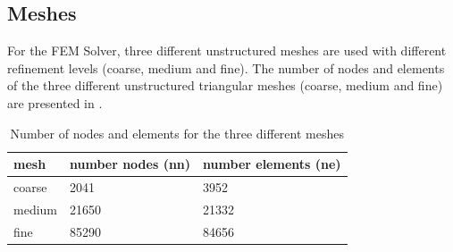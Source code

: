 \subsection{Meshes}
For the FEM Solver, three different unstructured meshes are used with different refinement levels (coarse, medium and fine). The number of nodes and elements of the three different unstructured triangular meshes (coarse, medium and fine) are presented in .
\renewcommand{\arraystretch}{2}
\begin{table}[h!]
	\begin{center}
		\begin{tabular}{ p{2cm} p{1.5cm} p{1.5cm} }
			\hline
			\hline
			mesh & number nodes (nn) & number elements (ne)\\
			\hline
			coarse & 2041 & 3952\\
			\hline
			medium & 21650 & 21332\\
			\hline
			fine & 85290 & 84656\\
			\hline
			\hline
		\end{tabular}
		\caption{\label{tab:Mesh} Number of nodes and elements for the three different meshes}
	\end{center}
\end{table}
\renewcommand{\arraystretch}{1}